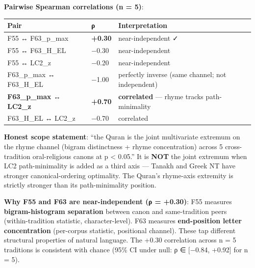 \documentclass[
]{article}
\newcounter{none} %
\begin{document}
\textbf{Pairwise Spearman correlations (n = 5)}:

{\def\LTcaptype{none} %
\begin{longtable}[]{@{}
  >{\raggedright\arraybackslash}p{}
  >{\raggedleft\arraybackslash}p{}
  >{\raggedright\arraybackslash}p{}@{}}
\toprule\noalign{}
\begin{minipage}[b]{\linewidth}\raggedright
Pair
\end{minipage} & \begin{minipage}[b]{\linewidth}\raggedleft
ρ
\end{minipage} & \begin{minipage}[b]{\linewidth}\raggedright
Interpretation
\end{minipage} \\
\midrule\noalign{}
\endhead
\bottomrule\noalign{}
\endlastfoot
F55 ↔ F63\_p\_max & \textbf{+0.30} & near-independent ✓ \\
F55 ↔ F63\_H\_EL & −0.30 & near-independent \\
F55 ↔ LC2\_z & −0.20 & near-independent \\
F63\_p\_max ↔ F63\_H\_EL & −1.00 & perfectly inverse (same channel; not
independent) \\
\textbf{F63\_p\_max ↔ LC2\_z} & \textbf{+0.70} & \textbf{correlated} ---
rhyme tracks path-minimality \\
F63\_H\_EL ↔ LC2\_z & −0.70 & correlated \\
\end{longtable}
}

\textbf{Honest scope statement}: ``the Quran is the joint multivariate
extremum on the rhyme channel (bigram distinctness + rhyme
concentration) across 5 cross-tradition oral-religious canons at p
\textless{} 0.05.'' It is \textbf{NOT} the joint extremum when LC2
path-minimality is added as a third axis --- Tanakh and Greek NT have
stronger canonical-ordering optimality. The Quran's rhyme-axis extremity
is strictly stronger than its path-minimality position.

\textbf{Why F55 and F63 are near-independent (ρ = +0.30)}: F55 measures
\textbf{bigram-histogram separation} between canon and same-tradition
peers (within-tradition statistic, character-level). F63 measures
\textbf{end-position letter concentration} (per-corpus statistic,
positional channel). These tap different structural properties of
natural language. The +0.30 correlation across n = 5 traditions is
consistent with chance (95\% CI under null: ρ ∈ {[}−0.84, +0.92{]} for n
= 5).
\end{document}
